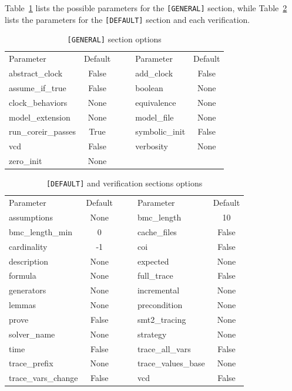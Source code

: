 \documentclass{article}
\theoremstyle{definition}
\begin{document}
Table~\ref{tab:general_section} lists the possible parameters for the
\texttt{[GENERAL]} section, while Table~\ref{tab:verification_section}
lists the parameters for the \texttt{[DEFAULT]} section and each
verification.

\begin{table}[h]
  \centering
\begin{tabular}{ l c c l c }
  Parameter & Default & & Parameter & Default \\ \cline{1-2} \cline{4-5}
abstract\_clock & False & ~~ & add\_clock & False \\
assume\_if\_true & False & ~~ & boolean & None \\
clock\_behaviors & None & ~~ & equivalence & None \\
model\_extension & None & ~~ & model\_file & None \\
run\_coreir\_passes & True & ~~ & symbolic\_init & False \\
vcd & False & ~~ & verbosity & None \\
zero\_init & None
\end{tabular}
\caption{\texttt{[GENERAL]} section options}
\label{tab:general_section}
\end{table}

\begin{table}[h]
  \centering
\begin{tabular}{ l c c l c }
  Parameter & Default & & Parameter & Default \\ \cline{1-2} \cline{4-5}
assumptions & None & ~~ & bmc\_length & 10 \\
bmc\_length\_min & 0 & ~~ & cache\_files & False \\
cardinality & -1 & ~~ & coi & False \\
description & None & ~~ & expected & None \\
formula & None & ~~ & full\_trace & False \\
generators & None & ~~ & incremental & None \\
lemmas & None & ~~ & precondition & None \\
prove & False & ~~ & smt2\_tracing & None \\
solver\_name & None & ~~ & strategy & None \\
time & False & ~~ & trace\_all\_vars & False \\
trace\_prefix & None & ~~ & trace\_values\_base & None \\
trace\_vars\_change & False & ~~ & vcd & False
\end{tabular}
\caption{\texttt{[DEFAULT]} and verification sections options}
\label{tab:verification_section}
\end{table}
\end{document}
